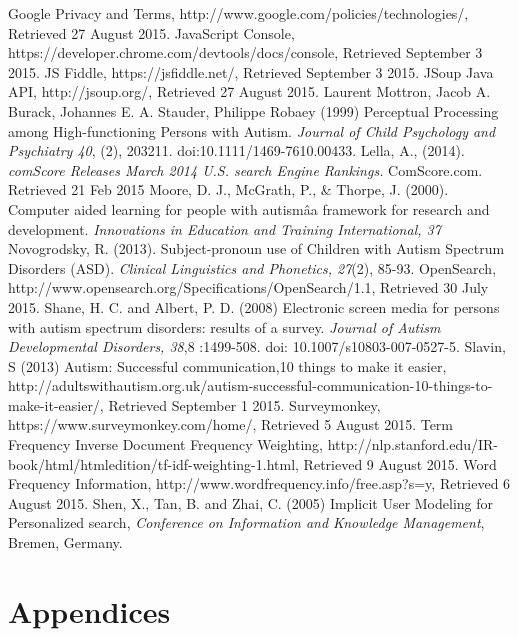 \documentclass[a4paper, 11pt]{article}
\begin{document}
\begin{thebibliography}{100}
 Google Privacy and Terms, http://www.google.com/policies/technologies/, Retrieved 27 August 2015.
 JavaScript Console, https://developer.chrome.com/devtools/docs/console, Retrieved September 3 2015.
 JS Fiddle, https://jsfiddle.net/, Retrieved September 3 2015.
 JSoup Java API, http://jsoup.org/, Retrieved 27 August 2015.
Laurent Mottron, Jacob A. Burack, Johannes E. A. Stauder, Philippe Robaey (1999) Perceptual Processing among High-functioning Persons with Autism. \textit{Journal of Child Psychology and Psychiatry 40}, (2), 203211. doi:10.1111/1469-7610.00433.
Lella, A., (2014). \textit{comScore Releases March 2014 U.S. search Engine Rankings.} ComScore.com. Retrieved 21 Feb 2015
Moore, D. J., McGrath, P., \& Thorpe, J. (2000). Computer aided learning for people with autismâa framework for research and development. \textit{Innovations in Education and Training International, 37}
 Novogrodsky, R. (2013). Subject-pronoun use of Children with Autism Spectrum Disorders (ASD). \textit{Clinical Linguistics and Phonetics, 27}(2), 85-93. 
OpenSearch, http://www.opensearch.org/Specifications/OpenSearch/1.1, Retrieved 30 July 2015.
Shane, H. C. and Albert, P. D. (2008) Electronic screen media for persons with autism spectrum disorders: results of a survey. \textit{Journal of Autism Developmental Disorders, 38},8 :1499-508. doi: 10.1007/s10803-007-0527-5.
 Slavin, S (2013) Autism: Successful communication,10 things to make it easier, http://adultswithautism.org.uk/autism-successful-communication-10-things-to-make-it-easier/, Retrieved September 1 2015.
Surveymonkey, https://www.surveymonkey.com/home/, Retrieved 5 August 2015.
 Term Frequency Inverse Document Frequency Weighting, http://nlp.stanford.edu/IR-book/html/htmledition/tf-idf-weighting-1.html, Retrieved 9 August 2015.
 Word Frequency Information, http://www.wordfrequency.info/free.asp?s=y, Retrieved 6 August 2015.
Shen, X., Tan, B. and Zhai, C. (2005) Implicit User Modeling for Personalized search, \textit{Conference on Information and Knowledge Management}, Bremen, Germany.
\end{thebibliography}





\newpage
\section {Appendices}
\end{document}
